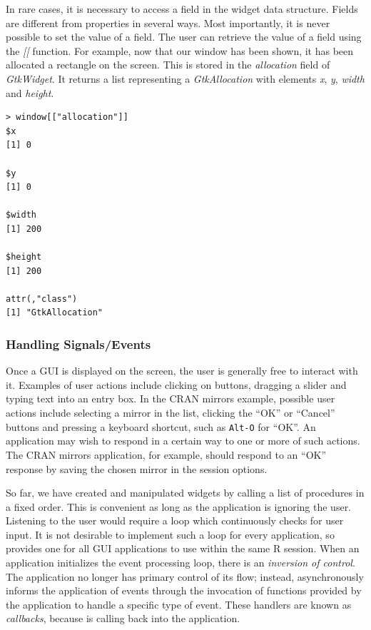 \documentclass[article]{jss}
\begin{document}
In rare cases, it is necessary to access a field in the widget data
structure.
Fields are different from properties in several ways. Most
importantly, it is
never possible to set the value of a field. The user can retrieve the
value of
a field using the \emph{[[} function. For example, now that our window
has been shown, it has been allocated a rectangle on the screen. This
is stored
in the \emph{allocation} field of \emph{GtkWidget}. It returns a list 
representing a \emph{GtkAllocation} with elements \emph{x}, \emph{y}, \emph{width} and \emph{height}.


\begin{verbatim}
> window[["allocation"]]
$x
[1] 0

$y
[1] 0

$width
[1] 200

$height
[1] 200

attr(,"class")
[1] "GtkAllocation"
\end{verbatim}


\subsubsection{Handling Signals/Events}

Once a GUI is displayed on the screen, the user is generally free to
interact with it. Examples of user actions include clicking on
buttons, dragging a slider and typing text into an entry box.  In the
CRAN mirrors example, possible user actions include selecting a mirror
in the list, clicking the ``OK'' or ``Cancel'' buttons and pressing a
keyboard shortcut, such as \texttt{Alt-O} for ``OK''.  An application
may wish to respond in a certain way to one or more of such actions.
The CRAN mirrors application, for example, should respond to an ``OK''
response by saving the chosen mirror in the session options.

So far, we have created and manipulated widgets by calling a list of
procedures in a fixed order. This is convenient as long as the
application is ignoring the user. Listening to the user would require
a loop which continuously checks for user input.  It is not desirable
to implement such a loop for every application, so  provides
one for all GUI applications to use within the same R session. When an
application initializes the  event processing loop, there is
an \emph{inversion of control}. The application no longer has primary
control of its flow; instead,  asynchronously informs the
application of events through the invocation of functions provided by
the application to handle a specific type of event. These handlers are
known as \emph{callbacks}, because  is calling back into the
application.
\end{document}
